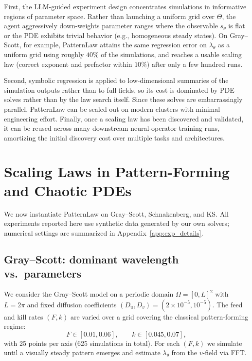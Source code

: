 \documentclass{article}
\theoremstyle{plain}
\theoremstyle{definition}
\theoremstyle{remark}
\begin{document}
First, the LLM-guided experiment design concentrates simulations in informative regions of parameter space. Rather than launching a uniform grid over $\Theta$, the agent aggressively down-weights parameter ranges where the observable $s_\theta$ is flat or the PDE exhibits trivial behavior (e.g., homogeneous steady states). On Gray--Scott, for example, PatternLaw attains the same regression error on $\lambda_\theta$ as a uniform grid using roughly $40\%$ of the simulations, and reaches a usable scaling law (correct exponent and prefactor within $10\%$) after only a few hundred runs.

Second, symbolic regression is applied to low-dimensional summaries of the simulation outputs rather than to full fields, so its cost is dominated by PDE solves rather than by the law search itself. Since these solves are embarrassingly parallel, PatternLaw can be scaled out on modern clusters with minimal engineering effort. Finally, once a scaling law has been discovered and validated, it can be reused across many downstream neural-operator training runs, amortizing the initial discovery cost over multiple tasks and architectures.

\section{Scaling Laws in Pattern-Forming and Chaotic PDEs}
\label{sec:scaling_pdes}

We now instantiate PatternLaw on Gray--Scott, Schnakenberg, and KS. All experiments reported here use synthetic data generated by our own solvers; numerical settings are summarized in Appendix~\ref{app:exp_details}.

\subsection{Gray--Scott: dominant wavelength vs.\ parameters}

We consider the Gray--Scott model on a periodic domain $\Omega=[0,L]^2$ with $L=2\pi$ and fixed diffusion coefficients $(D_u,D_v)=(2\times 10^{-5},10^{-5})$. The feed and kill rates $(F,k)$ are varied over a grid covering the classical pattern-forming regime:
\[
F \in [0.01,0.06], \qquad k \in [0.045,0.07],
\]
with 25 points per axis (625 simulations in total). For each $(F,k)$ we simulate until a visually steady pattern emerges and estimate $\lambda_\theta$ from the $v$-field via FFT.
\end{document}
